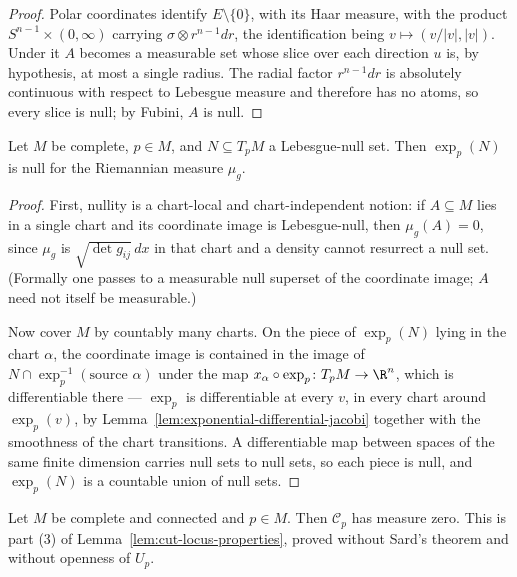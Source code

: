 \begin{proof}
\sketch

Polar coordinates identify $E\setminus\{0\}$, with its Haar measure,
with the product $S^{n-1}\times(0,\infty)$ carrying
$\sigma\otimes r^{n-1}dr$, the identification being $v\mapsto
(v/\lvert v\rvert,\lvert v\rvert)$. Under it $A$ becomes a measurable
set whose slice over each direction $u$ is, by hypothesis, at most a
single radius. The radial factor $r^{n-1}dr$ is absolutely continuous
with respect to Lebesgue measure and therefore has no atoms, so every
slice is null; by Fubini, $A$ is null.
\end{proof}

\begin{lemma}
\label{lem:exp-preserves-null}





Let $M$ be complete, $p\in M$, and $N\subseteq T_pM$ a Lebesgue-null
set. Then $\exp_p(N)$ is null for the Riemannian measure $\mu_g$.
\end{lemma}

\begin{proof}
\sketch
{}

First, nullity is a chart-local and chart-independent notion: if
$A\subseteq M$ lies in a single chart and its coordinate image is
Lebesgue-null, then $\mu_g(A)=0$, since $\mu_g$ is
$\sqrt{\det g_{ij}}\,dx$ in that chart and a density cannot resurrect a
null set. (Formally one passes to a measurable null superset of the
coordinate image; $A$ need not itself be measurable.)

Now cover $M$ by countably many charts. On the piece of $\exp_p(N)$
lying in the chart $\alpha$, the coordinate image is contained in the
image of $N\cap\exp_p^{-1}(\text{source }\alpha)$ under the map
$x_\alpha\circ\exp_p\colon T_pM\to\R^n$, which is differentiable there
--- $\exp_p$ is differentiable at every $v$, in every chart around
$\exp_p(v)$, by Lemma~\ref{lem:exponential-differential-jacobi}
together with the smoothness of the chart transitions. A differentiable
map between spaces of the same finite dimension carries null sets to
null sets, so each piece is null, and $\exp_p(N)$ is a countable union
of null sets.
\end{proof}

\begin{lemma}
\label{lem:cut-locus-null}





Let $M$ be complete and connected and $p\in M$. Then ${\mathcal C}_p$
has measure zero. This is part (3) of
Lemma~\ref{lem:cut-locus-properties}, proved without Sard's theorem and
without openness of $U_p$.
\end{lemma}

